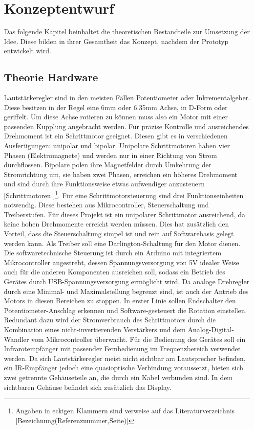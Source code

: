 \documentclass[11pt, titlepage]{report}
\begin{document}
	\chapter{Konzeptentwurf}
		Das folgende Kapitel beinhaltet die theoretischen Bestandteile zur Umsetzung der Idee. Diese bilden in ihrer Gesamtheit das Konzept,
		nachdem der Prototyp entwickelt wird.
		\section{Theorie Hardware}
		\label{sec:Theorie Hardware}
			Lautstärkeregler sind in den meisten Fällen Potentiometer oder Inkrementalgeber. Diese besitzen in der Regel eine 6mm oder 6.35mm Achse, in D-Form oder geriffelt. Um diese Achse rotieren zu können muss also ein Motor mit einer passenden Kupplung angebracht werden. Für präzise Kontrolle und ausreichendes Drehmoment ist ein Schrittmotor geeignet. Diesen gibt es in verschiedenen Ausfertigungen: unipolar und bipolar. 
			\newline Unipolare Schrittmotoren haben vier Phasen (Elektromagnete) und werden nur in einer Richtung von Strom durchflossen. Bipolare polen ihre Magnetfelder durch Umkehrung der Stromrichtung um, sie haben zwei Phasen, erreichen ein höheres Drehmoment und sind durch ihre Funktionsweise etwas aufwendiger anzusteuern [Schrittmotoren \cite[S.4]{Schrittmotoren}]\footnote{Angaben in eckigen Klammern sind verweise auf das Literaturverzeichnis [Bezeichnung(Referenznummer,Seite)]}.
			\newline Für eine Schrittmotorsteuerung sind drei Funktionseinheiten notwendig. Diese bestehen aus Mikrocontroller, Steuerschaltung und Treiberstufen. Für dieses Projekt ist ein unipolarer Schrittmotor ausreichend, da keine hohen Drehmomente erreicht werden müssen. Dies hat zusätzlich den Vorteil, dass die Steuerschaltung simpel ist und rein auf Softwarebasis gelegt werden kann. Als Treiber soll eine Darlington-Schaltung für den Motor dienen. Die softwaretechnische Steuerung ist durch ein Arduino mit integriertem Mikrocontroller angestrebt, dessen Spannungsversorgung von 5V idealer Weise auch für die anderen Komponenten ausreichen soll, sodass ein Betrieb des Gerätes durch USB-Spannungsversorgung ermöglicht wird. 
			\newline Da analoge Drehregler durch eine Minimal- und Maximalstellung begrenzt sind, ist auch der Antrieb des Motors in diesen Bereichen zu stoppen. In erster Linie sollen Endschalter den Potentiometer-Anschlag erkennen und Software-gesteuert die Rotation einstellen. Redundant dazu wird der Stromverbrauch des Schrittmotors durch die Kombination eines nicht-invertierenden Verstärkers und dem Analog-Digital-Wandler vom Mikrocontroller überwacht. 
			\newline Für die Bedienung des Gerätes soll ein Infrarotempfänger mit passender Fernbedienung im Frequenzbereich verwendet werden. Da sich Lautstärkeregler meist nicht sichtbar am Lautsprecher befinden, ein IR-Empfänger jedoch eine quasioptische Verbindung voraussetzt, bieten sich zwei getrennte Gehäuseteile an, die durch ein Kabel verbunden sind. In dem sichtbaren Gehäuse befindet sich zusätzlich das Display.
		\newpage
\end{document}
